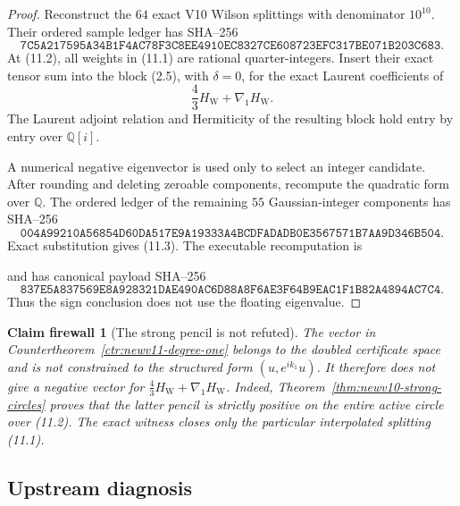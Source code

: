 \documentclass[11pt,oneside]{article}
\newtheorem{firewall}[theorem]{Claim firewall}
\theoremstyle{definition}
\theoremstyle{remark}
\begin{document}
\begin{proof}
Reconstruct the \(64\) exact V10 Wilson splittings with denominator
\(10^{10}\).  Their ordered sample ledger has SHA--256
\[
\texttt{7C5A217595A34B1F4AC78F3C8EE4910EC8327CE608723EFC317BE071B203C683}.
                                                               \tag{11.4}
\]
At (11.2), all weights in (11.1) are rational quarter-integers.
Insert their exact tensor sum into the block (2.5), with
\(\delta=0\), for the exact Laurent coefficients of
\[
 \frac43H_{\mathrm W}+\nabla_1H_{\mathrm W}.
\]
The Laurent adjoint relation and Hermiticity of the resulting block
hold entry by entry over \(\mathbb Q[i]\).

A numerical negative eigenvector is used only to select an integer
candidate.  After rounding and deleting zeroable components, recompute
the quadratic form over \(\mathbb Q\).  The ordered ledger of the
remaining \(55\) Gaussian-integer components has SHA--256
\[
\texttt{004A99210A56854D60DA517E9A19333A4BCDFADADB0E3567571B7AA9D346B504}.
                                                               \tag{11.5}
\]
Exact substitution gives (11.3).  The executable recomputation is
\begin{center}
\footnotesize
{}
\end{center}
and has canonical payload SHA--256
\[
\texttt{837E5A837569E8A928321DAE490AC6D88A8F6AE3F64B9EAC1F1B82A4894AC7C4}.
                                                               \tag{11.6}
\]
Thus the sign conclusion does not use the floating eigenvalue.
\end{proof}

\begin{firewall}[The strong pencil is not refuted]
\label{fire:newv11-auxiliary}
The vector in Countertheorem~\ref{ctr:newv11-degree-one} belongs to
the doubled certificate space and is not constrained to the
structured form \((u,e^{ik_1}u)\).  It therefore does not give a
negative vector for
\(\frac43H_{\mathrm W}+\nabla_1H_{\mathrm W}\).
Indeed, Theorem~\ref{thm:newv10-strong-circles} proves that the latter
pencil is strictly positive on the entire active circle over
(11.2).  The exact witness closes only the particular interpolated
splitting (11.1).
\end{firewall}

\subsection{Upstream diagnosis}
\end{document}
